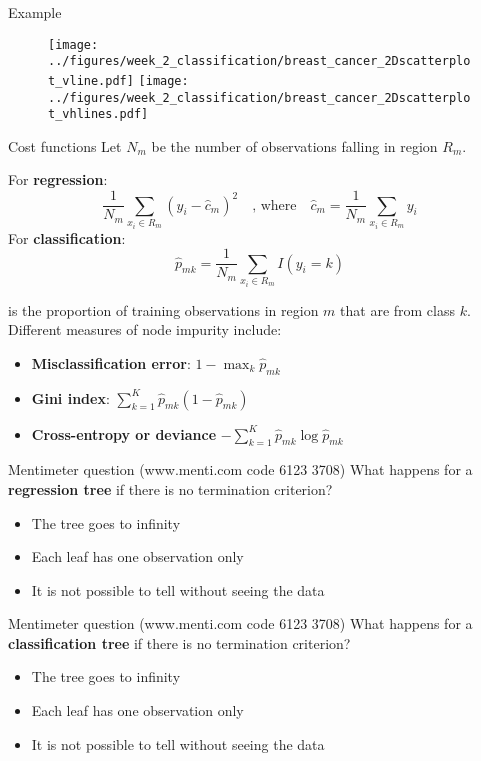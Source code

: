 \documentclass[notes]{beamer}          %
\begin{document}
\begin{frame}{Example}
 \begin{figure}
  \texttt{[image: ../figures/week\_2\_classification/breast\_cancer\_2Dscatterplot\_vline.pdf]}  
\endminipage\hfill
{}%
  \texttt{[image: ../figures/week\_2\_classification/breast\_cancer\_2Dscatterplot\_vhlines.pdf]}  
\endminipage
\end{figure}
\end{frame}




\begin{frame}{Cost functions}
Let $N_m$ be the number of observations falling in region $R_m$.

For \textbf{regression}:
$$\dfrac{1}{N_m}\sum_{x_i\in R_m}(y_i-\hat c_m)^2  \quad \mbox{, where} \quad \hat c_m = \dfrac{1}{N_m}\sum_{x_i\in R_m}y_i$$
For \textbf{classification}:
\begin{equation*}
	\hat{p}_{mk}=\dfrac{1}{N_m}\sum_{x_i\in R_m}I(y_i=k)
\end{equation*}

is the proportion of training observations in region $m$ that are from class $k$. Different measures of node impurity include:
\begin{itemize}
\item  \textbf{Misclassification error}: $1-\max_k \hat{p}_{mk}$
\item  \textbf{Gini index}: $\sum_{k=1}^K\hat{p}_{mk}(1-\hat{p}_{mk})$
\item  \textbf{Cross-entropy or deviance} $-\sum_{k=1}^K\hat{p}_{mk}\log\hat{p}_{mk}$
\end{itemize}
\end{frame}

\begin{frame}{Mentimeter question (www.menti.com code 6123 3708)}
What happens for a \textbf{regression tree} if there is no termination criterion?
\begin{itemize}
\item The tree goes to infinity
\item Each leaf has one observation only
\item It is not possible to tell without seeing the data
\end{itemize}	
\end{frame}

\begin{frame}{Mentimeter question (www.menti.com code 6123 3708)}
What happens for a \textbf{classification tree} if there is no termination criterion?
\begin{itemize}
\item The tree goes to infinity
\item Each leaf has one observation only
\item It is not possible to tell without seeing the data
\end{itemize}	
\end{frame}
\end{document}
